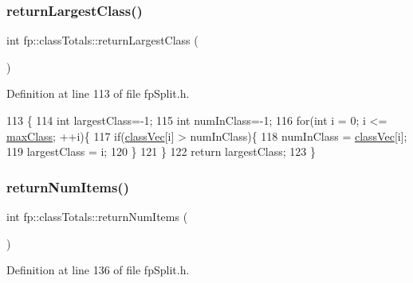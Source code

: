 \subsubsection{\texorpdfstring{return\+Largest\+Class()}{returnLargestClass()}}
{\footnotesize\ttfamily int fp\+::class\+Totals\+::return\+Largest\+Class (\begin{DoxyParamCaption}{ }\end{DoxyParamCaption})\hspace{0.3cm}{\ttfamily [inline]}}



Definition at line 113 of file fp\+Split.\+h.


\begin{DoxyCode}
113                                            \{
114                 \textcolor{keywordtype}{int} largestClass=-1; 
115                 \textcolor{keywordtype}{int} numInClass=-1;
116                 \textcolor{keywordflow}{for}(\textcolor{keywordtype}{int} i = 0; i <= \hyperlink{classfp_1_1classTotals_a83aa8e17bf3b31db3ae19b9ab554624b}{maxClass}; ++i)\{
117                     \textcolor{keywordflow}{if}(\hyperlink{classfp_1_1classTotals_af96102537592dbda8601d0235dfccfca}{classVec}[i] > numInClass)\{
118                         numInClass = \hyperlink{classfp_1_1classTotals_af96102537592dbda8601d0235dfccfca}{classVec}[i];
119                         largestClass = i;
120                     \}
121                 \}
122                 \textcolor{keywordflow}{return} largestClass;
123             \}
\end{DoxyCode}
\mbox{\label{classfp_1_1classTotals_ad4bc21663842003780efaf9fd2b75360}} 
\subsubsection{\texorpdfstring{return\+Num\+Items()}{returnNumItems()}}
{\footnotesize\ttfamily int fp\+::class\+Totals\+::return\+Num\+Items (\begin{DoxyParamCaption}{ }\end{DoxyParamCaption})\hspace{0.3cm}{\ttfamily [inline]}}



Definition at line 136 of file fp\+Split.\+h.


